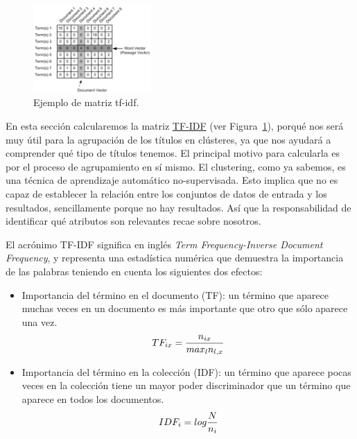\documentclass{uimppracticas}
\begin{document}
\begin{figure}
	\centering
	\includegraphics[width=0.4\textwidth]{images/matrix}
	\caption{Ejemplo de matriz tf-idf.}
	\label{matrix}
\end{figure}

En esta sección calcularemos la matriz \href{https://es.wikipedia.org/wiki/Tf-idf}{TF-IDF} (ver Figura~\ref{matrix}), porqué nos será muy útil para la agrupación de los títulos en clústeres, ya que nos ayudará a comprender qué tipo de títulos tenemos. El principal motivo para calcularla es por el proceso de agrupamiento en sí mismo. El clustering, como ya sabemos, es una técnica de aprendizaje automático no-supervisada. Esto implica que no es capaz de establecer la relación entre los conjuntos de datos de entrada y los resultados, sencillamente porque no hay resultados. Así que la responsabilidad de identificar qué atributos son relevantes recae sobre nosotros. 

El acrónimo TF-IDF significa en inglés \textit{Term Frequency-Inverse Document Frequency}, y representa una estadística numérica que demuestra la importancia de las palabras teniendo en cuenta los siguientes dos efectos:

\begin{itemize}
	\item Importancia del término en el documento (TF): un término que aparece muchas veces en un documento
	es más importante que otro que sólo aparece una vez.
	\begin{equation}
		\large TF_{ix} = \frac{n_{ix}}{max_{l} n_{l,x}}
	\end{equation}
	
	\item Importancia del término en la colección (IDF): un término que aparece pocas veces en la colección
	tiene un mayor poder discriminador que un término que aparece en todos los documentos.
	\begin{equation}
		\large IDF_i = log \frac{N}{n_{i}}
	\end{equation}
\end{itemize}
\end{document}
